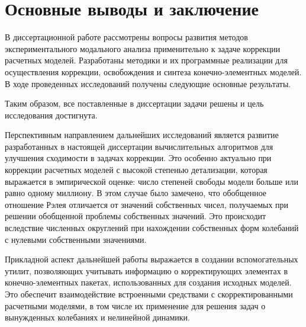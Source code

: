 
\chapter*{Основные выводы и заключение} 

В диссертационной работе рассмотрены вопросы развития методов экспериментального модального анализа применительно к задаче коррекции расчетных моделей. Разработаны методики и их программные реализации для осуществления коррекции, освобождения и синтеза конечно-элементных моделей. В ходе проведенных исследований получены следующие основные результаты.



Таким образом, все поставленные в диссертации задачи решены и цель исследования достигнута.

Перспективным направлением дальнейших исследований является развитие разработанных в настоящей диссертации вычислительных алгоритмов для улучшения сходимости в задачах коррекции. Это особенно актуально при коррекции расчетных моделей с высокой степенью детализации, которая выражается в эмпирической оценке: число степеней свободы модели больше или равно одному миллиону. В этом случае было замечено, что обобщенное отношение Рэлея отличается от значений собственных чисел, получаемых при решении обобщенной проблемы собственных значений. Это происходит вследствие численных округлений при нахождении собственных форм колебаний с нулевыми собственными значениями.

Прикладной аспект дальнейшей работы выражается в создании вспомогательных утилит, позволяющих учитывать информацию о корректирующих элементах в конечно-элементных пакетах, использованных для создания исходных моделей. Это обеспечит взаимодействие встроенными средствами с скорректированными расчетными моделями, в том числе их применение для решения задач о вынужденных колебаниях и нелинейной динамики.

